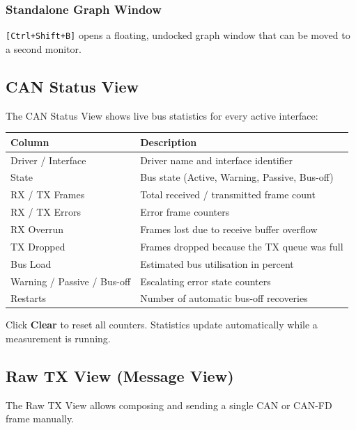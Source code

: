 \documentclass[a4paper,11pt]{article}
\newcommand{\key}[1]{\texttt{\small[#1]}}
\newcommand{\ui}[1]{\textbf{#1}}
\begin{document}
\subsubsection{Standalone Graph Window}

\key{Ctrl+Shift+B} opens a floating, undocked graph window that can be moved to a
second monitor.

\subsection{CAN Status View}

The CAN Status View shows live bus statistics for every active interface:

\begin{table}[h]
  \centering
  \begin{tabularx}{\textwidth}{lX}
    \toprule
    \textbf{Column} & \textbf{Description} \\
    \midrule
    Driver / Interface & Driver name and interface identifier \\
    State              & Bus state (Active, Warning, Passive, Bus-off) \\
    RX / TX Frames     & Total received / transmitted frame count \\
    RX / TX Errors     & Error frame counters \\
    RX Overrun         & Frames lost due to receive buffer overflow \\
    TX Dropped         & Frames dropped because the TX queue was full \\
    Bus Load           & Estimated bus utilisation in percent \\
    Warning / Passive / Bus-off & Escalating error state counters \\
    Restarts           & Number of automatic bus-off recoveries \\
    \bottomrule
  \end{tabularx}
\end{table}

Click \ui{Clear} to reset all counters. Statistics update automatically while a
measurement is running.

\subsection{Raw TX View (Message View)}
\label{sec:rawtx}

The Raw TX View allows composing and sending a single CAN or CAN-FD frame manually.
\end{document}
